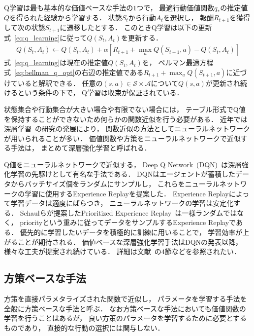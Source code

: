 Q学習は最も基本的な価値ベースな手法の$1$つで， 最適行動価値関数$q_*$の推定値$Q$を得られた経験から学習する．
状態$S_t$から行動$A_t$を選択し， 報酬$R_{t+1}$を獲得して次の状態$S_{t+1}$に遷移したとする．
このときQ学習は以下の更新式~\ref{eq:q_learning}に従って$Q(S_t, A_t)$を更新する．
\begin{align}
  \label{eq:q_learning}
  Q(S_t, A_t) \leftarrow Q(S_t, A_t) + \alpha [R_{t+1} + \max_a Q(S_{t+1}, a) - Q(S_t, A_t)] 
\end{align}
式~\ref{eq:q_learning}は現在の推定値$Q(S_t, A_t)$を， ベルマン最適方程式~\ref{eq:bellman_q_opt}の右辺の推定値である$R_{t+1} + \max_a Q(S_{t+1}, a)$に近づけていると解釈できる．
任意の$(s, a) \in \mathcal{S} \times \mathcal{A}$について$Q(s,a)$が更新され続けるという条件の下で， Q学習は収束が保証されている．

状態集合や行動集合が大きい場合や有限でない場合には， テーブル形式でQ値を保持することができないため何らかの関数近似を行う必要がある．
近年では深層学習~\cite{DeepLearning}の研究の発展により， 関数近似の方法としてニューラルネットワークが用いられることが多い．
価値関数や方策をニューラルネットワークで近似する手法は， まとめて深層強化学習と呼ばれる．

Q値をニューラルネットワークで近似する， Deep Q Network~(DQN)~\cite{DQN}は深層強化学習の先駆けとして有名な手法である． 
DQNはエージェントが蓄積したデータからバッチサイズ個をランダムにサンプルし， これらをニューラルネットワークの学習に使用するExperience Replayを提案した．
Experience Replayによって学習データは適度にばらつき， ニューラルネットワークの学習は安定化する．
Schaulらが提案したPrioritized Experience Replay~\cite{prioritized}は一様ランダムではなく， priorityという重みに従ってデータをサンプルするExperience Replayである．
優先的に学習したいデータを積極的に訓練に用いることで， 学習効率が上がることが期待される．
価値ベースな深層強化学習手法はDQNの発表以降， 様々な工夫が提案され続けている．
詳細は文献~\cite{deepRL}の$4$節などを参照されたい．

\subsection{方策ベースな手法}
方策を直接パラメタライズされた関数で近似し， パラメータを学習する手法を全般に方策ベースな手法と呼ぶ．
なお方策ベースな手法においても価値関数の学習を行うことはあるが， 良い方策のパラメータを学習するために必要とするものであり， 直接的な行動の選択には関与しない．


